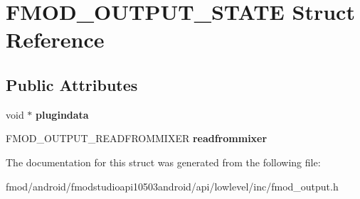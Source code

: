 \hypertarget{struct_f_m_o_d___o_u_t_p_u_t___s_t_a_t_e}{\section{F\+M\+O\+D\+\_\+\+O\+U\+T\+P\+U\+T\+\_\+\+S\+T\+A\+T\+E Struct Reference}
\label{struct_f_m_o_d___o_u_t_p_u_t___s_t_a_t_e}
}
\subsection*{Public Attributes}
\begin{DoxyCompactItemize}
\item 
\hypertarget{struct_f_m_o_d___o_u_t_p_u_t___s_t_a_t_e_a14384e8f23665883e32c6888fe7575e8}{void $\ast$ {\bfseries plugindata}}\label{struct_f_m_o_d___o_u_t_p_u_t___s_t_a_t_e_a14384e8f23665883e32c6888fe7575e8}

\item 
\hypertarget{struct_f_m_o_d___o_u_t_p_u_t___s_t_a_t_e_a297cdb7fbba2150340cceecf8d4c9ca1}{F\+M\+O\+D\+\_\+\+O\+U\+T\+P\+U\+T\+\_\+\+R\+E\+A\+D\+F\+R\+O\+M\+M\+I\+X\+E\+R {\bfseries readfrommixer}}\label{struct_f_m_o_d___o_u_t_p_u_t___s_t_a_t_e_a297cdb7fbba2150340cceecf8d4c9ca1}

\end{DoxyCompactItemize}


The documentation for this struct was generated from the following file\+:\begin{DoxyCompactItemize}
\item 
fmod/android/fmodstudioapi10503android/api/lowlevel/inc/fmod\+\_\+output.\+h\end{DoxyCompactItemize}
